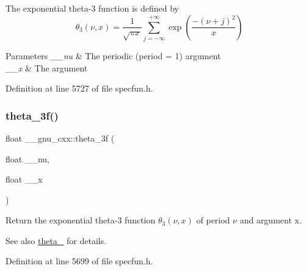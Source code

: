 The exponential theta-\/3 function is defined by \[ \theta_3(\nu,x) = \frac{1}{\sqrt{\pi x}} \sum_{j=-\infty}^{+\infty} \exp\left( \frac{-(\nu+j)^2}{x} \right) \]


\begin{DoxyParams}{Parameters}
{\em \+\_\+\+\_\+nu} & The periodic (period = 1) argument \\
\hline
{\em \+\_\+\+\_\+x} & The argument \\
\hline
\end{DoxyParams}


Definition at line 5727 of file specfun.\+h.

\mbox{\label{group__mathsf__gnu_ga9a7c967d2a456f1a6aceee9a53f024b1}} 
\subsubsection{\texorpdfstring{theta\+\_\+3f()}{theta\_3f()}}
{\footnotesize\ttfamily float \+\_\+\+\_\+gnu\+\_\+cxx\+::theta\+\_\+3f (\begin{DoxyParamCaption}\item[{float}]{\+\_\+\+\_\+nu,  }\item[{float}]{\+\_\+\+\_\+x }\end{DoxyParamCaption})\hspace{0.3cm}{\ttfamily [inline]}}

Return the exponential theta-\/3 function $ \theta_3(\nu,x) $ of period $ \nu $ and argument {\ttfamily x}.

\begin{DoxySeeAlso}{See also}
\hyperlink{group__mathsf__gnu_ga146c3b8e86991e164d4bf143cda5f0fc}{theta\+\_} for details. 
\end{DoxySeeAlso}


Definition at line 5699 of file specfun.\+h.

\mbox{\label{group__mathsf__gnu_gaf88874ff6c69940d2191f7947d2ea119}} 
